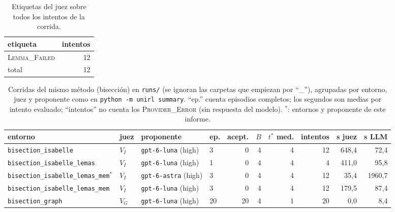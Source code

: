 \documentclass[11pt,a4paper]{article}
\begin{document}
\begin{table}[!ht]
\centering
\footnotesize
\setlength{\tabcolsep}{4pt}
\begin{tabular}{@{}lr@{}}
\toprule
etiqueta & intentos \\
\midrule
\textsc{Lemma\_Failed} & 12 \\
total & 12 \\
\bottomrule
\end{tabular}
\caption{Etiquetas del juez sobre todos los intentos de la corrida.}
\label{tab:etiquetas}
\end{table}

\begin{table}[!ht]
\centering
\scriptsize
\setlength{\tabcolsep}{4pt}
\begin{tabular}{@{}llllrrrrrr@{}}
\toprule
entorno & juez & proponente & ep. & acept. & $B$ & $t^*$ med. & intentos & s juez & s LLM \\
\midrule
\texttt{bisection\_\allowbreak{}isabelle} & $V_I$ & \texttt{gpt-\allowbreak{}6-\allowbreak{}luna} (high) & 3 & 0 & 4 & 4 & 12 & 648{,}4 & 72{,}4 \\
\texttt{bisection\_\allowbreak{}isabelle\_\allowbreak{}lemas} & $V_I$ & \texttt{gpt-\allowbreak{}6-\allowbreak{}luna} (high) & 1 & 0 & 4 & 4 & 4 & 411{,}0 & 95{,}8 \\
\texttt{bisection\_\allowbreak{}isabelle\_\allowbreak{}lemas\_\allowbreak{}mem}$^\ast$ & $V_I$ & \texttt{gpt-\allowbreak{}6-\allowbreak{}astra} (high) & 3 & 0 & 4 & 4 & 12 & 35{,}4 & 1960{,}7 \\
\texttt{bisection\_\allowbreak{}isabelle\_\allowbreak{}lemas\_\allowbreak{}mem} & $V_I$ & \texttt{gpt-\allowbreak{}6-\allowbreak{}luna} (high) & 3 & 0 & 4 & 4 & 12 & 179{,}5 & 87{,}4 \\
\texttt{bisection\_\allowbreak{}graph} & $V_G$ & \texttt{gpt-\allowbreak{}6-\allowbreak{}luna} (high) & 20 & 20 & 4 & 1 & 20 & 0{,}0 & 8{,}4 \\
\bottomrule
\end{tabular}
\caption{Corridas del mismo método (bisección) en \texttt{runs/} (se ignoran las carpetas que empiezan por ``\_''), agrupadas por entorno, juez y proponente como en \texttt{python -m unirl summary}. ``ep.'' cuenta episodios completos; los segundos son medias por intento evaluado; ``intentos'' no cuenta los \textsc{Provider\_Error} (sin respuesta del modelo). $^\ast$: entornos y proponente de este informe.}
\label{tab:comparacion}
\end{table}
\end{document}
